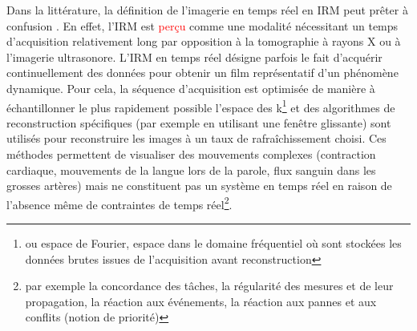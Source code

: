 Dans la littérature, la définition de l’imagerie en temps réel en \ac{IRM} peut prêter à confusion \cite{dietz2018nomenclature}. En effet, l’\ac{IRM} est \textcolor{red}{perçu} comme une modalité nécessitant un temps d’acquisition relativement long par opposition à la tomographie à rayons X ou à l’imagerie ultrasonore. L’\ac{IRM} en temps réel désigne parfois le fait d’acquérir continuellement des données pour obtenir un film représentatif d’un phénomène dynamique. Pour cela, la séquence d’acquisition est optimisée de manière à échantillonner le plus rapidement possible l’espace des k\footnote{ou espace de Fourier, espace dans le domaine fréquentiel où sont stockées les données brutes issues de l’acquisition avant reconstruction} et des algorithmes de reconstruction spécifiques (par exemple en utilisant une fenêtre glissante) sont utilisés pour reconstruire les images à un taux de rafraîchissement choisi. Ces méthodes permettent de visualiser des mouvements complexes (contraction cardiaque, mouvements de la langue lors de la parole, flux sanguin dans les grosses artères) mais ne constituent pas un système en temps réel en raison de l’absence même de contraintes de temps réel\footnote{par exemple la concordance des tâches, la régularité des mesures et de leur propagation, la réaction aux événements, la réaction aux pannes et aux conflits (notion de priorité)}.\\